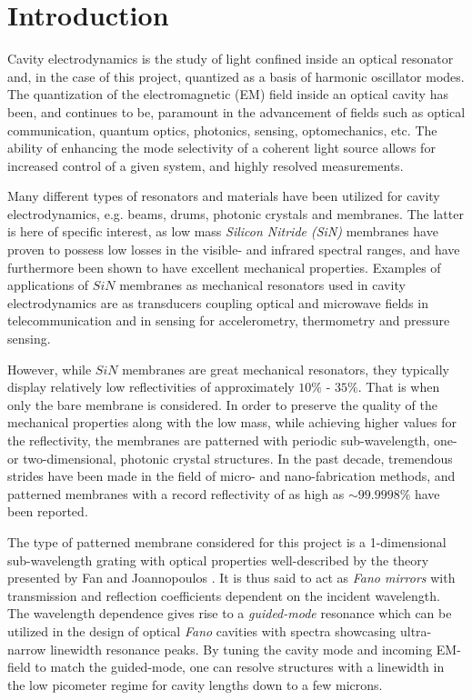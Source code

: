 \newpage
\section{Introduction}

Cavity electrodynamics\cite{Haroche} is the study of light confined inside an optical resonator and, in the case of this project, quantized as a basis of harmonic oscillator modes\cite{Sakurai}. The quantization of the electromagnetic (EM) field inside an optical cavity has been, and continues to be, paramount in the advancement of fields such as optical communication, quantum optics, photonics, sensing, optomechanics\cite{Monsel,Sankey}, etc. The ability of enhancing the mode selectivity of a coherent light source allows for increased control of a given system, and highly resolved measurements\cite{Vahala}.

Many different types of resonators and materials have been utilized for cavity electrodynamics, e.g. beams, drums, photonic crystals and membranes\cite{Thompson,Jayich}. The latter is here of specific interest, as low mass \emph{Silicon Nitride (SiN)} membranes\cite{Wilson} have proven to possess low losses in the visible- and infrared spectral ranges\cite{Land}, and have furthermore been shown to have excellent mechanical properties\cite{Seis,Cupertino}. Examples of applications of $SiN$ membranes as mechanical resonators used in cavity electrodynamics are as transducers coupling optical and microwave fields in telecommunication\cite{Bagci,Andrews} and in sensing for accelerometry\cite{Chowdhury,Manley}, thermometry\cite{Ferreiro-Vila,Zhang,Nair_thesis} and pressure sensing\cite{Naserbakht,Al-Sumaidae,Hornig,Salimi}. 

However, while $SiN$ membranes are great mechanical resonators, they typically display relatively low reflectivities of approximately $10\%$ - $35\%$. That is when only the bare membrane is considered. In order to preserve the quality of the mechanical properties along with the low mass, while achieving higher values for the reflectivity, the membranes are patterned with periodic sub-wavelength, one- or two-dimensional, photonic crystal structures\cite{Kemiktarak,Kemiktarak2,Bui,Norte,Reinhardt,Chen,Zhou}. In the past decade, tremendous strides have been made in the field of micro- and nano-fabrication methods, and patterned membranes with a record reflectivity of as high as $\sim 99.9998\%$ have been reported\cite{Xu,Sang,Enzian}.

The type of patterned membrane considered for this project is a 1-dimensional sub-wavelength grating with optical properties well-described by the theory presented by Fan and Joannopoulos \cite{Fan-Joannopoulos-guided-mode-resonance,Fan-Joannopoulos-fano-resonance}. It is thus said to act as \emph{Fano mirrors} with transmission and reflection coefficients dependent on the incident wavelength. The wavelength dependence gives rise to a \emph{guided-mode} resonance which can be utilized in the design of optical \emph{Fano} cavities with spectra showcasing ultra-narrow linewidth resonance peaks\cite{Mitra,Manjeshwar}. By tuning the cavity mode and incoming EM-field to match the guided-mode, one can resolve structures with a linewidth in the low picometer regime for cavity lengths down to a few microns. 

